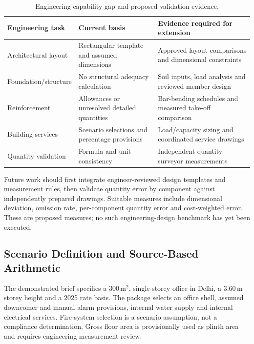 \documentclass[11pt,a4paper]{article}
\begin{document}
\begin{table}[H]\caption{Engineering capability gap and proposed validation evidence.}\small
\begin{tabularx}{\linewidth}{p{.23\linewidth}XX}\toprule
Engineering task & Current basis & Evidence required for extension \\\midrule
Architectural layout & Rectangular template and assumed dimensions & Approved-layout comparisons and dimensional constraints \\
Foundation/structure & No structural adequacy calculation & Soil inputs, load analysis and reviewed member design \\
Reinforcement & Allowances or unresolved detailed quantities & Bar-bending schedules and measured take-off comparison \\
Building services & Scenario selections and percentage provisions & Load/capacity sizing and coordinated service drawings \\
Quantity validation & Formula and unit consistency & Independent quantity surveyor measurements \\\bottomrule
\end{tabularx}\end{table}

Future work should first integrate engineer-reviewed design templates and measurement rules, then validate quantity error by component against independently prepared drawings. Suitable measures include dimensional deviation, omission rate, per-component quantity error and cost-weighted error. These are proposed measures; no such engineering-design benchmark has yet been executed.

\subsection{Scenario Definition and Source-Based Arithmetic}
The demonstrated brief specifies a 300\,m$^2$, single-storey office in Delhi, a 3.60\,m storey height and a 2025 rate basis. The package selects an office shell, assumed downcomer and manual alarm provisions, internal water supply and internal electrical services. Fire-system selection is a scenario assumption, not a compliance determination. Gross floor area is provisionally used as plinth area and requires engineering measurement review.
\end{document}
